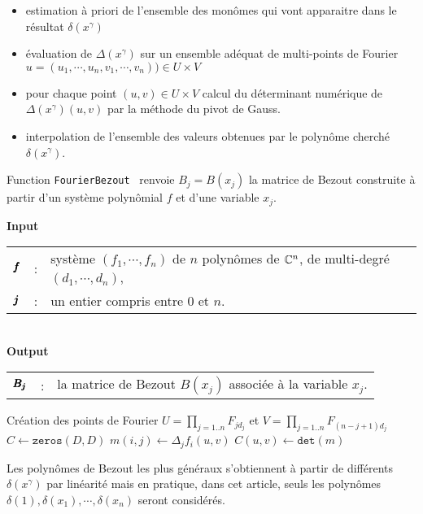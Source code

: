 \documentclass{standalone}
\begin{document}
  \begin{itemize}
  \item estimation à priori de l'ensemble des monômes qui vont apparaitre dans le résultat $\delta(x^\gamma)$
  \item évaluation de $\Delta(x^\gamma)$ sur un ensemble adéquat de multi-points de Fourier $u = (u_1,\cdots, u_n, v_1,\cdots, v_n) ) \in U\times V$
  \item pour chaque point $(u, v) \in U\times V$ calcul du déterminant numérique de $\Delta(x^\gamma)(u, v)$ par la méthode du pivot de Gauss.
  \item interpolation de l'ensemble des valeurs obtenues par le polynôme cherché $\delta(x^\gamma)$.
  \end{itemize}

  \begin{algorithm}[H]
  \caption{Function \texttt{FourierBezout} \ renvoie $B_j = B(x_j)$  la matrice de Bezout construite à partir d'un système polynômial $f$ et d'une variable $x_j$.}\label{algo:01}
  \textbf{Input\ }
    \begin{tabular}[t]{lcl}
      $\pmb{f}$  & : &  système $(f_1, \cdots, f_n)$ de $n$ polynômes de $\mathbb{C}^n$, de multi-degré $(d_1, \cdots, d_n)$,\\
       $\pmb{j}$ & : & un entier compris entre $0$ et $n$.
    \end{tabular}\\
  \textbf{Output\ }
    \begin{tabular}[t]{lcl}
        $\pmb{B_j}$  & : & la matrice de Bezout $B(x_j)$ associée à la variable $x_j$.
    \end{tabular}
  \begin{algorithmic}
  	\State Création des points de Fourier $U = \prod_{j=1..n} F_{jd_j}$ et $V = \prod_{j=1..n} F_{(n-j+1)d_j}$
  	\State $C \gets \texttt{zeros}(D, D)$
        		\State $m(i, j) \gets \Delta_j f_i(u, v)$
     		\EndFor
  		\State $C(u, v) \gets \texttt{det}(m)$
  	\EndFor
  \EndFunction
  \end{algorithmic}
  \end{algorithm}

  \begin{rem}
  Les polynômes de Bezout les plus généraux s'obtiennent à partir de différents $\delta(x^\gamma)$ par linéarité mais en pratique, dans cet article, seuls les polynômes $\delta(1),\delta(x_1),\cdots,\delta(x_n)$ seront considérés.
  \end{rem}
\end{document}
